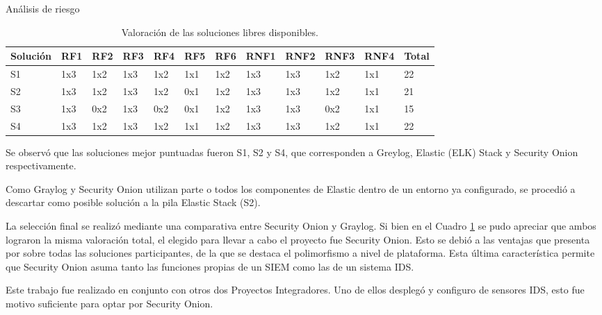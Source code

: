\begin{section}{Análisis de riesgo}
\begin{table}[H]
\begin{tabular}{|m{4em}|m{2em}|m{2em}|m{2em}|m{2em}|m{2em}|m{2em}|m{3em}|m{3em}|m{3em}|m{3em}| m{2em}|}
            \hline 
                Solución & RF1& RF2& RF3& RF4& RF5& RF6& RNF1& RNF2& RNF3& RNF4 & Total\\ 
            \hline
                S1 & 1x3 & 1x2 & 1x3 & 1x2 & 1x1 & 1x2 & 1x3 & 1x3 & 1x2 & 1x1 & 22\\ 
            \hline
                S2  & 1x3 & 1x2 & 1x3 & 1x2 & 0x1 & 1x2 & 1x3 & 1x3 & 1x2 & 1x1 & 21   \\ 
            \hline
                S3 & 1x3 & 0x2 & 1x3 & 0x2 & 0x1 & 1x2 & 1x3 & 1x3 & 0x2 & 1x1 & 15  \\
            \hline
                S4 & 1x3 & 1x2 & 1x3 & 1x2 & 1x1 & 1x2 & 1x3 & 1x3 & 1x2 & 1x1 & 22 \\
            \hline %
        \end{tabular}
        \caption{Valoración de las soluciones libres disponibles.}
        \label{table:11}
    \end{table} 
    \FloatBarrier
    Se observó que las soluciones mejor puntuadas fueron S1, S2 y S4, que corresponden a Greylog, Elastic (ELK) Stack y Security Onion respectivamente. \par
    Como Graylog y Security Onion utilizan parte o todos los componentes de Elastic dentro de un entorno ya configurado, se procedió a descartar como posible solución a la pila Elastic Stack (S2). \par
    La selección final se realizó mediante una comparativa entre Security Onion y Graylog. Si bien en el Cuadro \ref{table:11} se pudo apreciar que ambos lograron la misma valoración total, el elegido para llevar a cabo el proyecto fue Security Onion. Esto se debió a las ventajas que presenta por sobre todas las soluciones participantes, de la que se destaca el polimorfismo a nivel de plataforma. Esta última característica permite que Security Onion asuma tanto las funciones propias de un SIEM como las de un sistema IDS. \par
    Este trabajo fue realizado en conjunto con otros dos Proyectos Integradores. Uno de ellos desplegó y configuro de sensores IDS, esto fue motivo suficiente para optar por Security Onion. \par
    \end{section}
    \pagebreak
